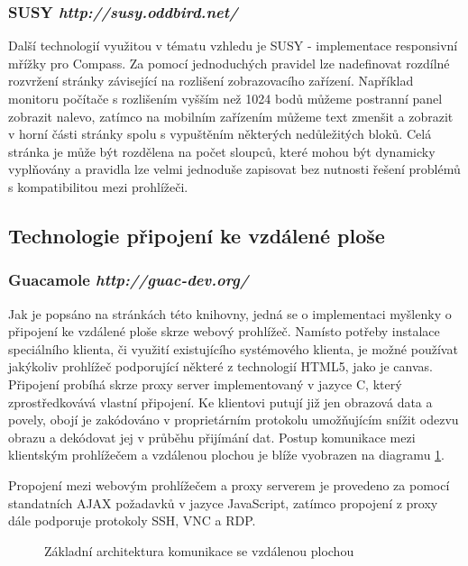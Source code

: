 \subsubsection*{SUSY \hfill \emph{http://susy.oddbird.net/}}
\label{subsec:susy}
Další technologií využitou v tématu vzhledu je SUSY - implementace responsivní mřížky pro Compass. Za pomocí jednoduchých pravidel lze nadefinovat rozdílné rozvržení stránky závisející na rozlišení zobrazovacího zařízení. Například monitoru počítače s rozlišením vyšším než 1024 bodů můžeme postranní panel zobrazit nalevo, zatímco na mobilním zařízením můžeme text zmenšit a zobrazit v horní části stránky spolu s vypuštěním některých nedůležitých bloků. Celá stránka je může být rozdělena na počet sloupců, které mohou být dynamicky vyplňovány a pravidla lze velmi jednoduše zapisovat bez nutnosti řešení problémů s kompatibilitou mezi prohlížeči.

\subsection{Technologie připojení ke vzdálené ploše}

\subsubsection*{Guacamole \hfill \emph{http://guac-dev.org/}}
\label{subsec:guacamole}
Jak je popsáno na stránkách této knihovny, jedná se o implementaci myšlenky o připojení ke vzdálené ploše skrze webový prohlížeč. Namísto potřeby instalace speciálního klienta, či využití existujícího systémového klienta, je možné používat jakýkoliv prohlížeč podporující některé z technologií HTML5, jako je canvas. Připojení probíhá skrze proxy server implementovaný v jazyce C, který zprostředkovává vlastní připojení. Ke klientovi putují již jen obrazová data a povely, obojí je zakódováno v proprietárním protokolu umožňujícím snížit odezvu obrazu a dekódovat jej v průběhu přijímání dat. Postup komunikace mezi klientským prohlížečem a vzdálenou plochou je blíže vyobrazen na diagramu \ref{fig:arch_core}.

Propojení mezi webovým prohlížečem a proxy serverem je provedeno za pomocí standatních AJAX požadavků v jazyce JavaScript, zatímco propojení z proxy dále podporuje protokoly SSH, VNC a RDP.

\begin{figure}[htp] 
  \caption{Základní architektura komunikace se vzdálenou plochou}
  \label{fig:arch_core}
\end{figure}  


